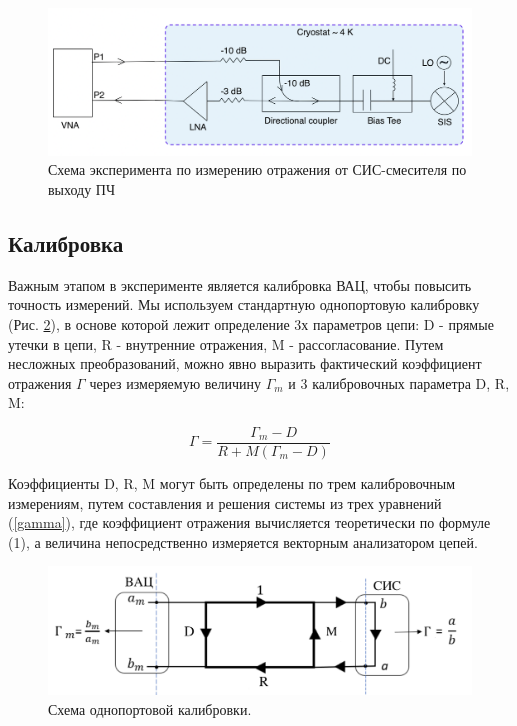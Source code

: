 \documentclass[a4paper]{article}
\begin{document}
\begin{figure}[H]
    \begin{center}
        \includegraphics[scale=0.5]{setup.png}
        \caption{Схема эксперимента по измерению отражения от СИС-смесителя по выходу ПЧ}
        \label{pic-setup}
    \end{center}
\end{figure}


\subsection{Калибровка}
Важным этапом в эксперименте является калибровка ВАЦ, чтобы повысить точность измерений. Мы используем стандартную однопортовую калибровку (Рис. \ref{pic-error}), 
в основе которой лежит определение 3х параметров цепи: D - прямые утечки в цепи, R - внутренние отражения, M - рассогласование. Путем несложных преобразований, 
можно явно выразить фактический коэффициент отражения $\Gamma$  через измеряемую величину $\Gamma_m$ и 3 калибровочных параметра D, R, M:

\begin{equation}
    \Gamma = \frac{\Gamma_m - D}{R + M(\Gamma_m - D)}
    \label{gamma}
\end{equation}

Коэффициенты D, R, M могут быть определены по трем калибровочным измерениям, путем составления и решения системы из трех уравнений (\ref{gamma}), где коэффициент отражения  вычисляется теоретически по формуле (1), а величина  непосредственно измеряется векторным анализатором цепей.

\begin{figure}[H]
    \begin{center}
        \includegraphics[scale=0.5]{Error.png}
        \caption{Схема однопортовой калибровки.}
        \label{pic-error}
    \end{center}
\end{figure}
\end{document}
